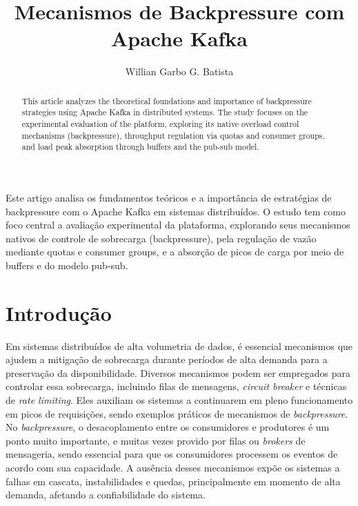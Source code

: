 \documentclass[12pt]{article}
\title{Mecanismos de Backpressure com Apache Kafka}
\author{Willian Garbo G. Batista\inst{1}}
\begin{document}
  \maketitle

  \begin{abstract}
    This article analyzes the theoretical foundations and importance of backpressure strategies using Apache Kafka in distributed systems. The study focuses on the experimental evaluation of the platform, exploring its native overload control mechanisms (backpressure), throughput regulation via quotas and consumer groups, and load peak absorption through buffers and the pub-sub model.
  \end{abstract}

  \begin{resumo}
    Este artigo analisa os fundamentos teóricos e a importância de estratégias de backpressure com o Apache Kafka em sistemas distribuídos. O estudo tem como foco central a avaliação experimental da plataforma, explorando seus mecanismos nativos de controle de sobrecarga (backpressure), pela regulação de vazão mediante quotas e consumer groups, e a absorção de picos de carga por meio de buffers e do modelo pub-sub.
  \end{resumo}

  \section{Introdução}
  Em sistemas distribuídos de alta volumetria de dados, é essencial mecanismos que ajudem a mitigação de sobrecarga durante períodos de alta demanda para a preservação da disponibilidade. Diversos mecanismos podem ser empregados para controlar essa sobrecarga, incluindo filas de mensagens, \textit{circuit breaker} e técnicas de \textit{rate limiting}. Eles auxiliam os sistemas a continuarem em pleno funcionamento em picos de requisições, sendo exemplos práticos de mecanismos de \textit{backpressure}. No \textit{backpressure}, o desacoplamento entre os consumidores e produtores é um ponto muito importante, e muitas vezes provido por filas ou \textit{brokers} de mensageria, sendo essencial para que os consumidores processem os eventos de acordo com sua capacidade. A ausência desses mecanismos expõe os sistemas a falhas em cascata, instabilidades e quedas, principalmente em momento de alta demanda, afetando a confiabilidade do sistema.
\end{document}
